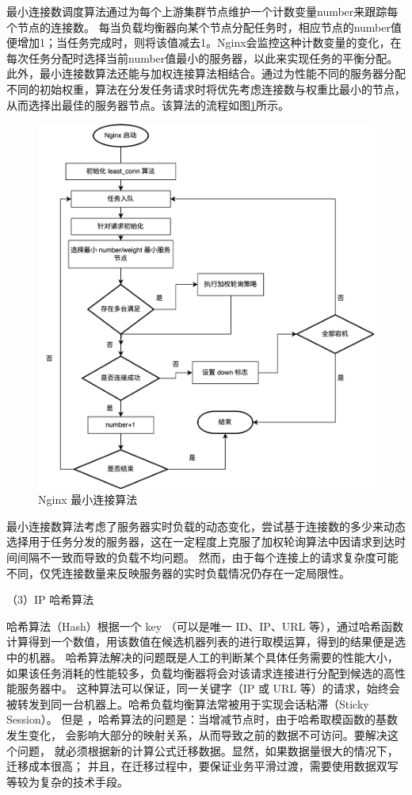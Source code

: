 最小连接数调度算法通过为每个上游集群节点维护一个计数变量number来跟踪每个节点的连接数。
每当负载均衡器向某个节点分配任务时，相应节点的number值便增加1；当任务完成时，则将该值减去1。Nginx会监控这种计数变量的变化，在每次任务分配时选择当前number值最小的服务器，以此来实现任务的平衡分配。此外，最小连接数算法还能与加权连接算法相结合。通过为性能不同的服务器分配不同的初始权重，算法在分发任务请求时将优先考虑连接数与权重比最小的节点，从而选择出最佳的服务器节点。该算法的流程如图\ref{minlinkconnection}所示。

\begin{figure}[htb]
	\centering
	\includegraphics[width=\textwidth]{figures/least-flowchart.png}
	\caption{Nginx 最小连接算法}
	\label{minlinkconnection}
\end{figure}

最小连接数算法考虑了服务器实时负载的动态变化，尝试基于连接数的多少来动态选择用于任务分发的服务器，这在一定程度上克服了加权轮询算法中因请求到达时间间隔不一致而导致的负载不均问题。
然而，由于每个连接上的请求复杂度可能不同，仅凭连接数量来反映服务器的实时负载情况仍存在一定局限性。

（3）IP 哈希算法

哈希算法（Hash）根据一个 key （可以是唯一 ID、IP、URL 等），通过哈希函数计算得到一个数值，用该数值在候选机器列表的进行取模运算，得到的结果便是选中的机器\cite{邱亚飞2021哈希算法的实现与验证}。
哈希算法解决的问题既是人工的判断某个具体任务需要的性能大小，如果该任务消耗的性能较多，负载均衡器将会对该请求连接进行分配到候选的高性能服务器中。
这种算法可以保证，同一关键字（IP 或 URL 等）的请求，始终会被转发到同一台机器上。哈希负载均衡算法常被用于实现会话粘滞（Sticky Session）。
但是 ，哈希算法的问题是：当增减节点时，由于哈希取模函数的基数发生变化，
会影响大部分的映射关系，从而导致之前的数据不可访问。要解决这个问题，
就必须根据新的计算公式迁移数据。显然，如果数据量很大的情况下，迁移成本很高；
并且，在迁移过程中，要保证业务平滑过渡，需要使用数据双写等较为复杂的技术手段。

